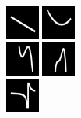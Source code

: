 \documentclass{article}
\begin{document}
\begin{figure}\vspace{-0.1cm} \newcommand{\functionSize}{1.1cm}\centering
  \begin{minipage}[c]{0.3\columnwidth}\vspace{0.5cm}
  \includegraphics[width = \functionSize]{figures/functions/6.png}
  \includegraphics[width = \functionSize]{figures/functions/48.png}\\
  \includegraphics[width = \functionSize]{figures/functions/102.png}
  \includegraphics[width = \functionSize]{figures/functions/116.png}\\
  \vspace{1pt}%
  \includegraphics[width = \functionSize]{figures/functions/160.png}

\end{minipage}
\end{figure}
\end{document}
